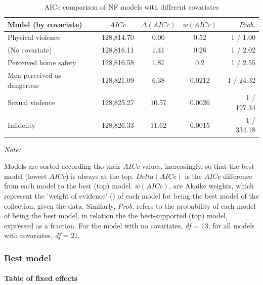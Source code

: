 \documentclass[
  bookmarksnumbered]{article}
\begin{document}
\begin{table}[H]
\centering
\caption{\label{tab:comp-m3}AICc comparison of NF models with different covariates}
\centering
\begin{threeparttable}
\begin{tabular}[t]{lcccr}
\toprule
Model (by covariate) & $AICc$ & $\Delta(AICc)$ & $w(AICc)$ & $Prob.$\\
\midrule
Physical violence & 128,814.70 & 0.00 & 0.52 & 1 / 1.00\\
(No covariate) & 128,816.11 & 1.41 & 0.26 & 1 / 2.02\\
Perceived home safety & 128,816.58 & 1.87 & 0.2 & 1 / 2.55\\
Men perceived as dangerous & 128,821.09 & 6.38 & 0.0212 & 1 / 24.32\\
Sexual violence & 128,825.27 & 10.57 & 0.0026 & 1 / 197.34\\
Infidelity & 128,826.33 & 11.62 & 0.0015 & 1 / 334.18\\
\bottomrule
\end{tabular}
\begin{tablenotes}[para]
\item \textit{Note: } 
\item Models are sorted according tho their $AICc$ values, increasingly, 
             so that the best model (lowest $AICc$) is always at the top. 
             $Delta(AICc)$ is the $AICc$ difference from each model to the best (top) model. 
             $w(AICc)$, are Akaike weights, which represent the 'weight of evidence'
             (\cite{portetPrimerModelSelection2020}) of each model for being the best model 
             of the collection, given the data. 
             Similarly, \textit{Prob.} refers to the probability of each model of being the 
             best model, in relation the the best-supported (top) model, expressed as a 
             fraction. For the model with no covariates, \textit{df} = 13; for all models 
             with covariates, \textit{df} = 21.
\end{tablenotes}
\end{threeparttable}
\end{table}

\subsubsection{Best model}\label{best-model-2}

\paragraph{Table of fixed effects}\label{table-of-fixed-effects-6}
\end{document}
